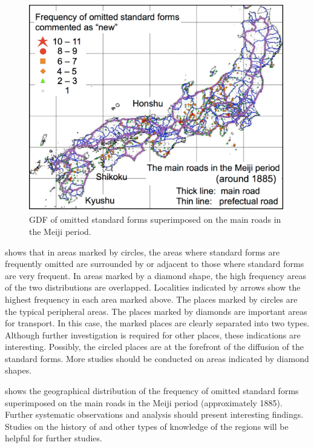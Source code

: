 \documentclass[output=paper]{LSP/langsci}
\begin{document}
\begin{figure}[b]
\includegraphics[height=.4\textheight]{illustrations/kuma_fig19}
\caption{GDF of omitted standard forms superimposed on the main roads in the Meiji period.}          
\label{fig:kuma:19}
\end{figure}             

 shows that in areas marked by circles, the areas where standard forms are frequently omitted are surrounded by or adjacent to those where standard forms are very frequent. In areas marked by a diamond shape, the high frequency areas of the two distributions are overlapped. Localities indicated by arrows show the highest frequency in each area marked above. The places marked by circles are the typical peripheral areas. The places marked by diamonds are important areas for transport. In this case, the marked places are clearly separated into two types. Although further investigation is required for other places, these indications are interesting. Possibly, the circled places are at the forefront of the diffusion of the standard forms. More studies should be conducted on areas indicated by diamond shapes.

 shows the geographical distribution of the frequency of omitted standard forms superimposed on the main roads in the Meiji period (approximately 1885). Further systematic observations and analysis should present interesting findings. Studies on the history of  and other types of knowledge of the regions will be helpful for further studies.
\end{document}
